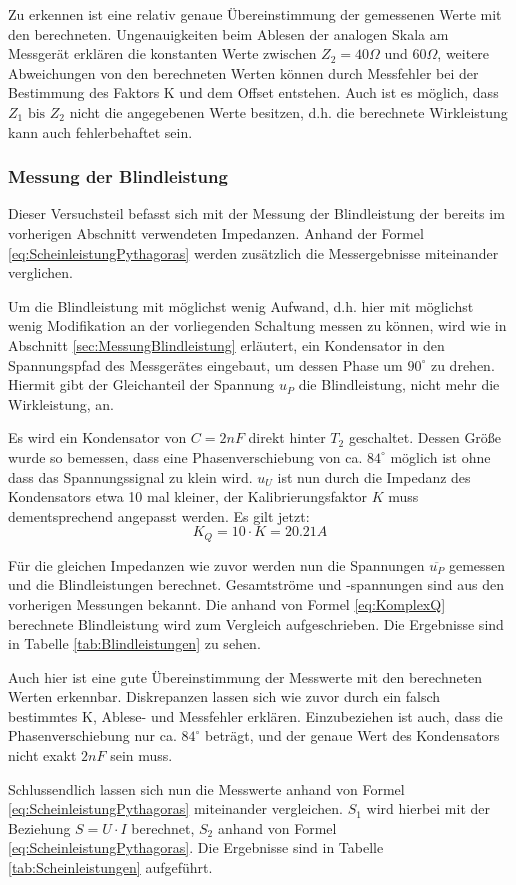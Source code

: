 Zu erkennen ist eine relativ genaue Übereinstimmung der gemessenen Werte mit den berechneten. Ungenauigkeiten beim Ablesen der analogen Skala am Messgerät erklären die konstanten Werte zwischen $Z_2 = 40\Omega$ und $60\Omega$, weitere Abweichungen von den berechneten Werten können durch Messfehler bei der Bestimmung des Faktors K und dem Offset entstehen. Auch ist es möglich, dass $Z_1 \mbox{ bis } Z_2$ nicht die angegebenen Werte besitzen, d.h. die berechnete Wirkleistung kann auch fehlerbehaftet sein.

\subsubsection{Messung der Blindleistung}
Dieser Versuchsteil befasst sich mit der Messung der Blindleistung der bereits im vorherigen Abschnitt verwendeten Impedanzen. Anhand der Formel \eqref{eq:ScheinleistungPythagoras} werden zusätzlich die Messergebnisse miteinander verglichen.

Um die Blindleistung mit möglichst wenig Aufwand, d.h. hier mit möglichst wenig Modifikation an der vorliegenden Schaltung messen zu können, wird wie in Abschnitt \ref{sec:MessungBlindleistung} erläutert, ein Kondensator in den Spannungspfad des Messgerätes eingebaut, um dessen Phase um $90^\circ$ zu drehen. Hiermit gibt der Gleichanteil der Spannung $u_P$ die Blindleistung, nicht mehr die Wirkleistung, an.

Es wird ein Kondensator von $C=2nF$ direkt hinter $T_2$ geschaltet. Dessen Größe wurde so bemessen, dass eine Phasenverschiebung von ca. $84^\circ$ möglich ist ohne dass das Spannungssignal zu klein wird. $u_U$ ist nun durch die Impedanz des Kondensators etwa 10 mal kleiner, der Kalibrierungsfaktor $K$ muss dementsprechend angepasst werden. Es gilt jetzt:
\begin{equation*}
K_{Q} = 10\cdot K = 20.21A
\end{equation*}

Für die gleichen Impedanzen wie zuvor werden nun die Spannungen $\overline{u_P}$ gemessen und die Blindleistungen berechnet. Gesamtströme und -spannungen sind aus den vorherigen Messungen bekannt. Die anhand von Formel \eqref{eq:KomplexQ} berechnete Blindleistung wird zum Vergleich aufgeschrieben. Die Ergebnisse sind in Tabelle \ref{tab:Blindleistungen} zu sehen.

Auch hier ist eine gute Übereinstimmung der Messwerte mit den berechneten Werten erkennbar. Diskrepanzen lassen sich wie zuvor durch ein falsch bestimmtes K, Ablese- und Messfehler erklären. Einzubeziehen ist auch, dass die Phasenverschiebung nur ca. $84^\circ$ beträgt, und der genaue Wert des Kondensators nicht exakt $2nF$ sein muss.

Schlussendlich lassen sich nun die Messwerte anhand von Formel \eqref{eq:ScheinleistungPythagoras} miteinander vergleichen. $S_1$ wird hierbei mit der Beziehung $S=U\cdot I$ berechnet, $S_2$ anhand von Formel \eqref{eq:ScheinleistungPythagoras}. Die Ergebnisse sind in Tabelle \ref{tab:Scheinleistungen} aufgeführt.